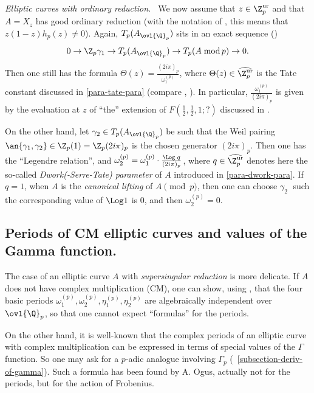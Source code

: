 \begin{para}{\itshape Elliptic curves with ordinary reduction.\ }
We now assume that $z\in {\Z}_p^{\mathrm{ur}}$ and that $A=X_z$ has good
ordinary reduction (with the notation of ,
this means that $z(1-z)h_p(z)\neq 0$).  Again, $T_p(A_{{\ovl{\Q}}_p})$
sits in an exact sequence (\cite[A.2.4]{alraec})
\begin{equation*}
0\rightarrow {\Z}_p \gamma_1\rightarrow
T_p(A_{{\ovl{\Q}}_p}) \rightarrow T_p(A\;\mathrm{mod}\, p) \rightarrow 0.
\end{equation*}
 Then one still has the formula $\Theta(z)=
\frac{(2i\pi)_p}{\omega^{(p)}_1}$, where $\Theta(z)\in
\widehat{{\Z}_p^{\mathrm{ur}}}$ is the Tate constant discussed in
\ref{para-tate-para} (compare \cite{pbl}, \cite[4.3]{itoecwcm}).  In
particular, $\frac{\omega^{(p)}_1}{(2i\pi)_p}$ is given by the
evaluation at $z$ of ``the'' extension of
$F(\frac{1}{2},\frac{1}{2},1;?)$ discussed in .

\noindent On the other hand, let $\gamma_2 \in T_p(A_{{\ovl{\Q}}_p})$ be
such that the Weil pairing $\an{\gamma_1,\gamma_2}\in {\Z}_p(1)={\Z}_p
(2i\pi)_p$ is the chosen generator $(2i\pi)_p$. Then one has the
``Legendre relation'', and $\omega^{(p)}_2 = \omega^{(p)}_1\cdot\frac{{\Log
\;q}}{{(2i\pi)_p}}$, where $q\in \widehat{{\Z}_p^{\mathrm{ur}}}$ denotes
here the so-called {\it Dwork(-Serre-Tate) parameter} of $A$ introduced
in \ref{para-dwork-para}.  If $q=1$, \ie when $A$ is the \emph{canonical
lifting} of $A\pmod{p}$, then one can choose $\gamma_2\;$ such the
corresponding value of ${\Log 1}$ is $0$, and then $\omega^{(p)}_2 =0.$
\end{para}

\subsection{Periods of CM elliptic curves and values of the Gamma function.}

\begin{para}
 The case of an elliptic curve $A$ with \emph{supersingular reduction} is
 more delicate.  If $A$ does not have complex multiplication (CM), one
 can show, using \cite[A.2.2]{alraec}, that the four basic periods
 $\omega^{(p)}_1,\omega^{(p)}_2,\eta^{(p)}_1,\eta^{(p)}_2$ are
 algebraically independent over ${\ovl{\Q}}_p$, so that one cannot
 expect ``formulas'' for the periods. 

  On the other hand, it is well-known that the complex
 periods of an elliptic curve with complex multiplication can be
 expressed in terms of special values of the $\Gamma$ function. So one
 may ask for a $p$-adic analogue involving $\Gamma_p$
 (\cf~\ref{subsection-deriv-of-gamma}).  Such a formula has been found by A.
 Ogus, actually not for the periods, but for the action of Frobenius.
\end{para}

